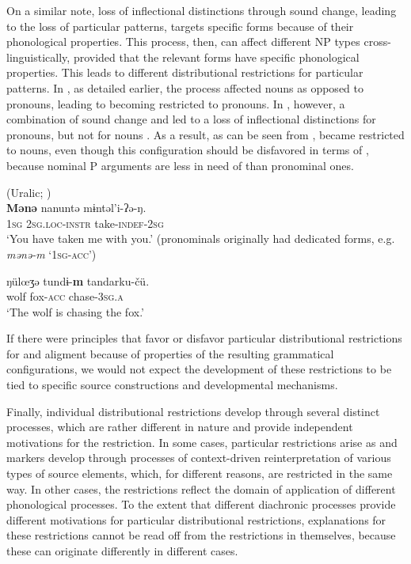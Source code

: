 \documentclass[output=paper]{langsci/langscibook}
\begin{document}
On a similar note, loss of inflectional distinctions through sound
change,
leading to the loss of particular  patterns, targets specific
forms because of their phonological properties. This process, then, can affect different NP types cross-linguistically,
provided that the relevant forms have specific phonological
properties. This leads to different distributional
restrictions for particular  patterns. In , as
detailed earlier, the process affected nouns as
opposed to pronouns, leading to   becoming
restricted to pronouns. In  , however, a combination of sound change and
 led to a  loss of inflectional
distinctions for pronouns, but not for nouns
. As a result, as can be seen from
,   became
restricted to nouns, even though this configuration should be
disfavored in terms of , because nominal P arguments are less in need
of  than pronominal ones.

\ea\label{nganasan}
 (Uralic; )\\
  \ea
    \gll \textbf{{Mənə}} nanuntə m​ɨntəl'i-ʔə-ŋ.\\
    1\textsc{sg} 2\textsc{sg.loc-instr} take-\textsc{indef}-2\textsc{sg}\\
    \glt `You have taken me with you.' (pronominals originally had dedicated  forms, e.g. {\em mənə-m} `1\textsc{sg-acc}')
    
  \ex
    \gll ŋül{\oe}ʒə tund​ɨ-\textbf{{m}} tandarku-čü.\\
    wolf fox-\textsc{acc} chase-3\textsc{sg.a}\\
    \glt `The wolf is chasing the fox.'
    
  \z
\z

If there were principles that favor or disfavor particular distributional
restrictions for  and  aligment because of properties of the
resulting grammatical configurations, we would not expect the development of
these restrictions to be tied to specific source
constructions and developmental mechanisms. 

Finally, individual distributional restrictions develop through several distinct
processes, which are rather different in nature and provide
independent motivations for the restriction. In some cases, particular
restrictions arise as  and   markers develop
through processes of context-driven reinterpretation of various types
of source elements, which, for different reasons, are restricted in the same way. In other cases, the restrictions reflect the domain of
application of different phonological processes. To the extent that different diachronic processes provide different
motivations for particular distributional restrictions, 
explanations for these restrictions cannot be read off from the
restrictions in themselves, because these can originate differently in
different cases.
\end{document}
